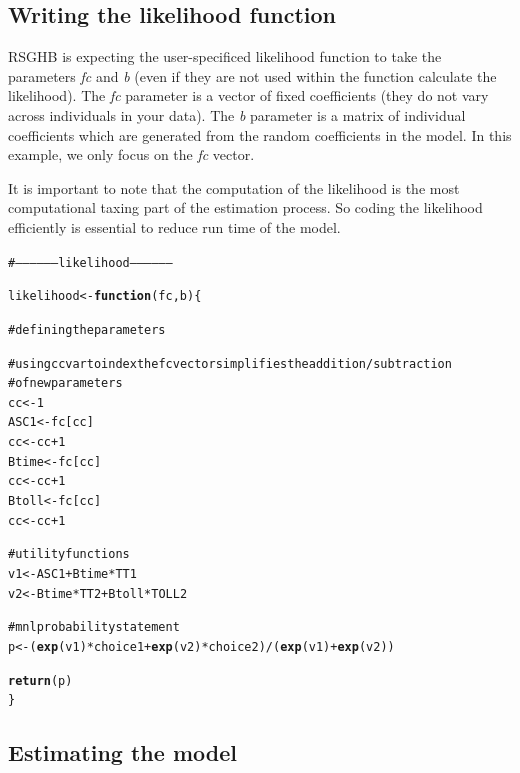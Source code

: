 \documentclass{article}\usepackage{graphicx, color}
\makeatletter
\newcommand{\hlfunctioncall}[1]{\textcolor[rgb]{0.501960784313725,0,0.329411764705882}{\textbf{#1}}}%
\newcommand{\hlcomment}[1]{\textcolor[rgb]{0.180392156862745,0.6,0.341176470588235}{#1}}%
\newenvironment{kframe}{%
 \def\at@end@of@kframe{}%
 \ifinner\ifhmode%
  \def\at@end@of@kframe{\end{minipage}}%
  \begin{minipage}{\columnwidth}%
 \fi\fi%
 \def\FrameCommand##1{\hskip\@totalleftmargin \hskip-\fboxsep
 \colorbox{shadecolor}{##1}\hskip-\fboxsep
     \hskip-\linewidth \hskip-\@totalleftmargin \hskip\columnwidth}%
 \MakeFramed {\advance\hsize-\width
   \@totalleftmargin\z@ \linewidth\hsize
   \@setminipage}}%
 {\par\unskip\endMakeFramed%
 \at@end@of@kframe}
\newenvironment{knitrout}{}{} %
\makeatother
\begin{document}
\subsection*{Writing the likelihood function}

RSGHB is expecting the user-specificed likelihood function to take the parameters \emph{fc} and \emph{b} (even if they are not used within the function calculate the likelihood). The \emph{fc} parameter is a vector of fixed coefficients (they do not vary across individuals in your data). The \emph{b} parameter is a matrix of individual coefficients which are generated from the random coefficients in the model. In this example, we only focus on the \emph{fc} vector.

It is important to note that the computation of the likelihood is the most computational taxing part of the estimation process. So coding the likelihood efficiently is essential to reduce run time of the model.


\begin{knitrout}
\color{fgcolor}\begin{kframe}
\begin{alltt}

\hlcomment{# ------------------ likelihood ------------------}

likelihood <- \hlfunctioncall{function}(fc, b) \{
    
\hlcomment{    # defining the parameters}
    
\hlcomment{    # using cc var to index the fc vector simplifies the addition/subtraction}
\hlcomment{    # of new parameters}
    cc <- 1
    ASC1 <- fc[cc]
    cc <- cc + 1
    Btime <- fc[cc]
    cc <- cc + 1
    Btoll <- fc[cc]
    cc <- cc + 1
    
\hlcomment{    # utility functions}
    v1 <- ASC1 + Btime * TT1
    v2 <- Btime * TT2 + Btoll * TOLL2
    
\hlcomment{    # mnl probability statement}
    p <- (\hlfunctioncall{exp}(v1) * choice1 + \hlfunctioncall{exp}(v2) * choice2)/(\hlfunctioncall{exp}(v1) + \hlfunctioncall{exp}(v2))
    
    \hlfunctioncall{return}(p)
\}
\end{alltt}
\end{kframe}
\end{knitrout}


\subsection*{Estimating the model}
\end{document}
